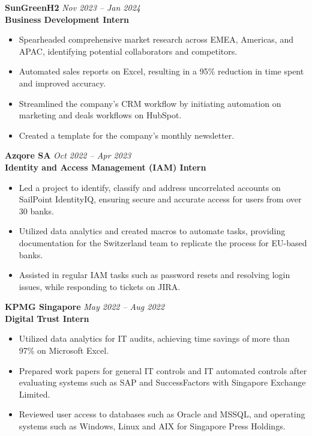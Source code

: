 \documentclass[a4paper,10pt]{article}
\newcommand{\resumeHeading}[4]{%
  \vspace{3pt}
  \textbf{#1} \hfill \textit{#2} \\
  \textbf{#3} \hfill \textit{#4}
  \vspace{1pt}
}
\begin{document}
\resumeHeading{SunGreenH2}{Nov 2023 -- Jan 2024}{Business Development Intern}{}
\begin{itemize}
  \item Spearheaded comprehensive market research across EMEA, Americas, and APAC, identifying potential collaborators and competitors.
  \item Automated sales reports on Excel, resulting in a 95\% reduction in time spent and improved accuracy.
  \item Streamlined the company's CRM workflow by initiating automation on marketing and deals workflows on HubSpot.
  \item Created a template for the company's monthly newsletter.
\end{itemize}

\resumeHeading{Azqore SA}{Oct 2022 -- Apr 2023}{Identity and Access Management (IAM) Intern}{}
\begin{itemize}
  \item Led a project to identify, classify and address uncorrelated accounts on SailPoint IdentityIQ, ensuring secure and accurate access for users from over 30 banks.
  \item Utilized data analytics and created macros to automate tasks, providing documentation for the Switzerland team to replicate the process for EU-based banks.
  \item Assisted in regular IAM tasks such as password resets and resolving login issues, while responding to tickets on JIRA.
\end{itemize}

\resumeHeading{KPMG Singapore}{May 2022 -- Aug 2022}{Digital Trust Intern}{}
\begin{itemize}
  \item Utilized data analytics for IT audits, achieving time savings of more than 97\% on Microsoft Excel.
  \item Prepared work papers for general IT controls and IT automated controls after evaluating systems such as SAP and SuccessFactors with Singapore Exchange Limited.
  \item Reviewed user access to databases such as Oracle and MSSQL, and operating systems such as Windows, Linux and AIX for Singapore Press Holdings.
\end{itemize}
\end{document}
